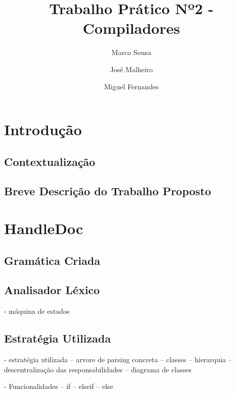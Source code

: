 \documentclass[runningheads]{llncs}
\begin{document}
%
\title{Trabalho Prático Nº2 - Compiladores}
%
%
\author{Marco Sousa \and
José Malheiro \and
Miguel Fernandes}
%
%
\maketitle              %
%
\begin{abstract}

\end{abstract}
%
%
%
\section{Introdução}
\subsection{Contextualização} 



\subsection{Breve Descrição do Trabalho Proposto}



\section{HandleDoc}
\subsection{Gramática Criada} \label{subsec:grammar}

\subsection{Analisador Léxico} \label{subsec:lex}
- máquina de estados

\subsection{Estratégia Utilizada}
- estratégia utilizada
-- arvore de parsing concreta
-- classes
-- hierarquia
-- descentralização das responsabilidades
-- diagrama de classes

- Funcionalidades
-- if 
-- elseif
-- else 
\end{document}
